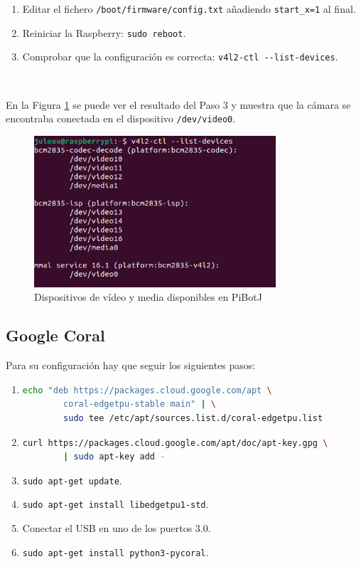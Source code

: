 \begin{enumerate}
	\item Editar el fichero \verb|/boot/firmware/config.txt| añadiendo \verb|start_x=1| al final.
	\item Reiniciar la Raspberry: \verb|sudo reboot|.
	\item Comprobar que la configuración es correcta: \verb|v4l2-ctl --list-devices|.
\end{enumerate}\

En la Figura \ref{fig:v4l2} se puede ver el resultado del Paso 3 y muestra que la cámara se encontraba conectada en el dispositivo \verb|/dev/video0|.

\begin{figure} [h!]
	\begin{center}
		\includegraphics[width=9cm]{figs/cap6/vl.png}
	\end{center}
	\caption{Dispositivos de vídeo y media disponibles en PiBotJ}
	\label{fig:v4l2}
\end{figure}


\subsection{Google Coral}
\label{subsec:anexogooglecoral}


Para su configuración hay que seguir los siguientes pasos: 

\begin{enumerate}
	\item 
	\begin{lstlisting}[language=bash]
		echo "deb https://packages.cloud.google.com/apt \
		coral-edgetpu-stable main" | \
		sudo tee /etc/apt/sources.list.d/coral-edgetpu.list
	\end{lstlisting}

	\item
	\begin{lstlisting}[language=bash]
		curl https://packages.cloud.google.com/apt/doc/apt-key.gpg \
		| sudo apt-key add -
	\end{lstlisting}
	\item \verb|sudo apt-get update|.
	\item \verb|sudo apt-get install libedgetpu1-std|.
	\item Conectar el USB en uno de los puertos 3.0.
	\item \verb|sudo apt-get install python3-pycoral|.
\end{enumerate}\

